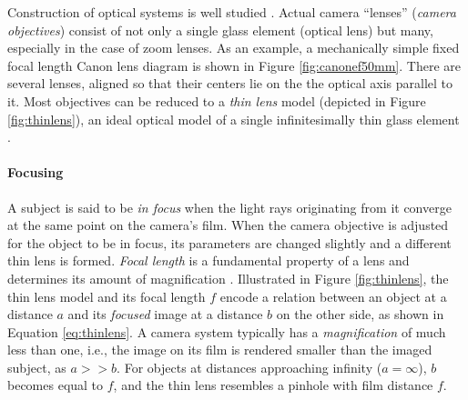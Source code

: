 Construction of optical systems is well studied \cite{kingslake1989history,greenleaf1950photographic}.
Actual camera ``lenses'' (\emph{camera objectives}) consist of not only a single glass element (optical lens) but many, especially in the case of zoom lenses.
As an example, a mechanically simple fixed focal length Canon lens diagram is shown in Figure \ref{fig:canonef50mm}.
There are several lenses, aligned so that their centers lie on the the optical axis parallel to it.
Most objectives can be reduced to a \emph{thin lens} model (depicted in Figure \ref{fig:thinlens}), an ideal optical model of a single infinitesimally thin glass element \cite{greenleaf1950photographic,szeliski10vision}.




\paragraph{Focusing}
A subject is said to be \emph{in focus} when the light rays originating from it converge at the same point on the camera's film.
When the camera objective is adjusted for the object to be in focus, its parameters are changed slightly and a different thin lens is formed.
\emph{Focal length} is a fundamental property of a lens and determines its amount of magnification \cite{szeliski10vision,greenleaf1950photographic}.
Illustrated in Figure \ref{fig:thinlens}, the thin lens model and its focal length $f$ encode a relation between an object at a distance $a$ and its \emph{focused} image at a distance $b$ on the other side, as shown in Equation \ref{eq:thinlens}.
A camera system typically has a \emph{magnification} of much less than one, i.e., the image on its film is rendered smaller than the imaged subject, as $a >> b$.
For objects at distances approaching infinity ($a = \infty$), $b$ becomes equal to $f$, and the thin lens resembles a pinhole with film distance $f$.

